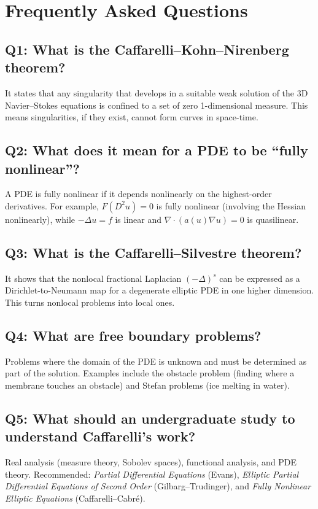\section{Frequently Asked Questions}

\subsection*{Q1: What is the Caffarelli--Kohn--Nirenberg theorem?}
It states that any singularity that develops in a suitable weak solution of the 3D Navier--Stokes equations is confined to a set of zero 1-dimensional measure. This means singularities, if they exist, cannot form curves in space-time.

\subsection*{Q2: What does it mean for a PDE to be ``fully nonlinear''?}
A PDE is fully nonlinear if it depends nonlinearly on the highest-order derivatives. For example, $F(D^2 u) = 0$ is fully nonlinear (involving the Hessian nonlinearly), while $-\Delta u = f$ is linear and $\nabla \cdot (a(u)\nabla u) = 0$ is quasilinear.

\subsection*{Q3: What is the Caffarelli--Silvestre theorem?}
It shows that the nonlocal fractional Laplacian $(-\Delta)^s$ can be expressed as a Dirichlet-to-Neumann map for a degenerate elliptic PDE in one higher dimension. This turns nonlocal problems into local ones.

\subsection*{Q4: What are free boundary problems?}
Problems where the domain of the PDE is unknown and must be determined as part of the solution. Examples include the obstacle problem (finding where a membrane touches an obstacle) and Stefan problems (ice melting in water).

\subsection*{Q5: What should an undergraduate study to understand Caffarelli's work?}
Real analysis (measure theory, Sobolev spaces), functional analysis, and PDE theory. Recommended: \textit{Partial Differential Equations} (Evans), \textit{Elliptic Partial Differential Equations of Second Order} (Gilbarg--Trudinger), and \textit{Fully Nonlinear Elliptic Equations} (Caffarelli--Cabr\'e).

